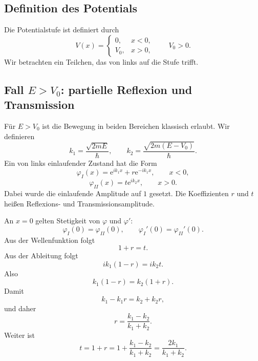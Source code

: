 \subsection{Definition des Potentials}

Die Potentialstufe ist definiert durch
\[
    V(x)=
    \begin{cases}
        0, & x<0,\\
        V_0, & x>0,
    \end{cases}
    \qquad V_0>0.
\]
Wir betrachten ein Teilchen, das von links auf die Stufe trifft.

\begin{center}
\end{center}

\subsection{Fall $E>V_0$: partielle Reflexion und Transmission}

Für $E>V_0$ ist die Bewegung in beiden Bereichen klassisch erlaubt. Wir definieren
\[
    k_1=\frac{\sqrt{2mE}}{\hbar},
    \qquad
    k_2=\frac{\sqrt{2m(E-V_0)}}{\hbar}.
\]
Ein von links einlaufender Zustand hat die Form
\[
    \varphi_I(x)=\mathrm{e}^{ik_1x}+r\mathrm{e}^{-ik_1x},
    \qquad x<0,
\]
\[
    \varphi_{II}(x)=t\mathrm{e}^{ik_2x},
    \qquad x>0.
\]
Dabei wurde die einlaufende Amplitude auf $1$ gesetzt. Die Koeffizienten $r$ und $t$ heißen Reflexions- und Transmissionsamplitude.

\begin{derivationbox}
An $x=0$ gelten Stetigkeit von $\varphi$ und $\varphi'$:
\[
    \varphi_I(0)=\varphi_{II}(0),
    \qquad
    \varphi_I'(0)=\varphi_{II}'(0).
\]
Aus der Wellenfunktion folgt
\[
    1+r=t.
\]
Aus der Ableitung folgt
\[
    ik_1(1-r)=ik_2t.
\]
Also
\[
    k_1(1-r)=k_2(1+r).
\]
Damit
\[
    k_1-k_1r=k_2+k_2r,
\]
und daher
\[
    r=\frac{k_1-k_2}{k_1+k_2}.
\]
Weiter ist
\[
    t=1+r=1+\frac{k_1-k_2}{k_1+k_2}
    =\frac{2k_1}{k_1+k_2}.
\]
\end{derivationbox}


